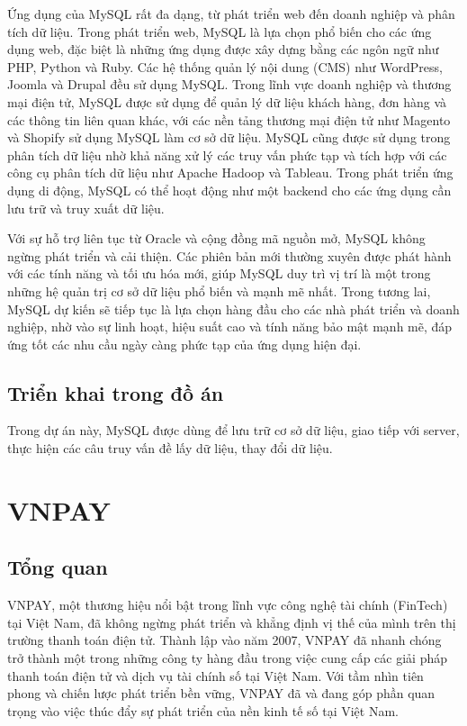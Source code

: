 \documentclass[../DoAn.tex]{subfiles}
\begin{document}
Ứng dụng của MySQL rất đa dạng, từ phát triển web đến doanh nghiệp và phân tích dữ liệu. Trong phát triển web, MySQL là lựa chọn phổ biến cho các ứng dụng web, đặc biệt là những ứng dụng được xây dựng bằng các ngôn ngữ như PHP, Python và Ruby. Các hệ thống quản lý nội dung (CMS) như WordPress, Joomla và Drupal đều sử dụng MySQL. Trong lĩnh vực doanh nghiệp và thương mại điện tử, MySQL được sử dụng để quản lý dữ liệu khách hàng, đơn hàng và các thông tin liên quan khác, với các nền tảng thương mại điện tử như Magento và Shopify sử dụng MySQL làm cơ sở dữ liệu. MySQL cũng được sử dụng trong phân tích dữ liệu nhờ khả năng xử lý các truy vấn phức tạp và tích hợp với các công cụ phân tích dữ liệu như Apache Hadoop và Tableau. Trong phát triển ứng dụng di động, MySQL có thể hoạt động như một backend cho các ứng dụng cần lưu trữ và truy xuất dữ liệu.

Với sự hỗ trợ liên tục từ Oracle và cộng đồng mã nguồn mở, MySQL không ngừng phát triển và cải thiện. Các phiên bản mới thường xuyên được phát hành với các tính năng và tối ưu hóa mới, giúp MySQL duy trì vị trí là một trong những hệ quản trị cơ sở dữ liệu phổ biến và mạnh mẽ nhất. Trong tương lai, MySQL dự kiến sẽ tiếp tục là lựa chọn hàng đầu cho các nhà phát triển và doanh nghiệp, nhờ vào sự linh hoạt, hiệu suất cao và tính năng bảo mật mạnh mẽ, đáp ứng tốt các nhu cầu ngày càng phức tạp của ứng dụng hiện đại.

\subsection{Triển khai trong đồ án}
\label{subsection:3.3.2}
Trong dự án này, MySQL được dùng để lưu trữ cơ sở dữ liệu, giao tiếp với server, thực hiện các câu truy vấn đề lấy dữ liệu, thay đổi dữ liệu.


\section{VNPAY}
\label{section:3.4}
\subsection{Tổng quan}
VNPAY, một thương hiệu nổi bật trong lĩnh vực công nghệ tài chính (FinTech) tại Việt Nam, đã không ngừng phát triển và khẳng định vị thế của mình trên thị trường thanh toán điện tử. Thành lập vào năm 2007, VNPAY đã nhanh chóng trở thành một trong những công ty hàng đầu trong việc cung cấp các giải pháp thanh toán điện tử và dịch vụ tài chính số tại Việt Nam. Với tầm nhìn tiên phong và chiến lược phát triển bền vững, VNPAY đã và đang góp phần quan trọng vào việc thúc đẩy sự phát triển của nền kinh tế số tại Việt Nam.
\end{document}
